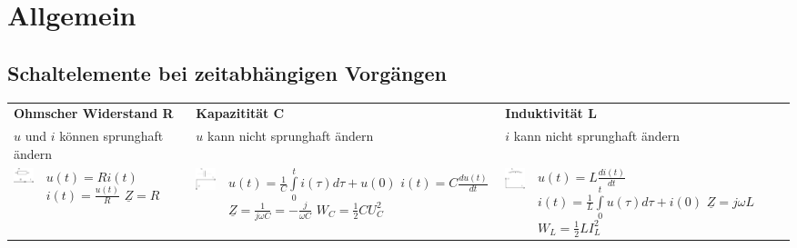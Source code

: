 
\section{Allgemein}
	\subsection{Schaltelemente bei zeitabhängigen Vorgängen}
	\begin{tabular}{p{1.5cm} p{4.3cm} p{1.5cm} p{4.3cm} p{1.5cm} p{4.3cm}}
   		\multicolumn{2}{l}{\textbf{Ohmscher Widerstand R}}
   			& \multicolumn{2}{l}{\textbf{Kapazitität C}}
   			& \multicolumn{2}{l}{\textbf{Induktivität L}} \\
   		\multicolumn{2}{l}{$u$ und $i$ können sprunghaft ändern}
   			& \multicolumn{2}{l}{$u$ kann nicht sprunghaft ändern}
   			& \multicolumn{2}{l}{$i$ kann nicht sprunghaft ändern} \\
   		\parbox{1.5cm}{
			\includegraphics[width=1.5cm]{./images/zeigerdiag-r.png}}
			& \parbox{4.3cm}{$u(t) = R i(t)$ \\
				$i(t) = \frac{u(t)}{R}$ \\
				$\underline{Z} = R$}
   			& \parbox{1.5cm}{
				\includegraphics[width=1.5cm]{./images/zeigerdiag-c.png}}
			& \parbox{4.3cm}{
				$u(t) = \frac1C \int\limits_0^t i(\tau) d\tau + u(0)$ \\
				$i(t) = C \frac{d u(t)}{dt}$ \\
				$\underline{Z} = \frac{1}{j \omega C} = - \frac{j}{\omega C}$ \\
				$W_C=\frac12 C U_C^2$}
   			& \parbox{1.5cm}{
				\includegraphics[width=1.5cm]{./images/zeigerdiag-l.png}}
			& \parbox{4.3cm}{
				$u(t) = L \frac{di(t)}{dt}$ \\
				$i(t) = \frac1L \int\limits_0^t u(\tau) d\tau + i(0)$ \\
				$\underline{Z} = j \omega L$ \\
				$W_L=\frac12 L I_L^2$}
   	\end{tabular}

